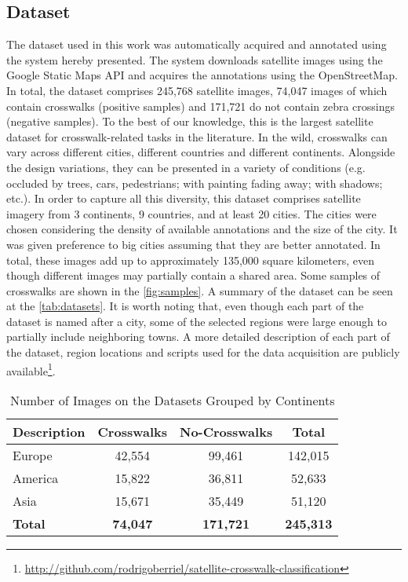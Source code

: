 \documentclass[journal]{IEEEtran}
\newcommand{\GoogleStaticMapsAPI}{Google Static Maps API\xspace}
\newcommand{\OpenStreetMap}{OpenStreetMap\xspace}
\begin{document}
\subsection{Dataset}
The dataset used in this work was automatically acquired and annotated using the system hereby presented. The system downloads satellite images using the \GoogleStaticMapsAPI and acquires the annotations using the \OpenStreetMap. In total, the dataset comprises 245,768 satellite images, 74,047 images of which contain crosswalks (positive samples) and 171,721 do not contain zebra crossings (negative samples). To the best of our knowledge, this is the largest satellite dataset for crosswalk-related tasks in the literature. In the wild, crosswalks can vary across different cities, different countries and different continents. Alongside the design variations, they can be presented in a variety of conditions (e.g. occluded by trees, cars, pedestrians; with painting fading away; with shadows; etc.). In order to capture all this diversity, this dataset comprises satellite imagery from 3 continents, 9 countries, and at least 20 cities. The cities were chosen considering the density of available annotations and the size of the city. It was given preference to big cities assuming that they are better annotated. In total, these images add up to approximately 135,000 square kilometers, even though different images may partially contain a shared area. Some samples of crosswalks are shown in the \autoref{fig:samples}. A summary of the dataset can be seen at the \autoref{tab:datasets}. It is worth noting that, even though each part of the dataset is named after a city, some of the selected regions were large enough to partially include neighboring towns. A more detailed description of each part of the dataset, region locations and scripts used for the data acquisition are publicly available\footnote{\url{http://github.com/rodrigoberriel/satellite-crosswalk-classification}}.

\begin{table}[!h]
	\centering
	\caption{Number of Images on the Datasets Grouped by Continents}
	\label{tab:datasets}
	\begin{tabular}{lccc}
		\toprule
		\textbf{Description}           & \textbf{Crosswalks} & \textbf{No-Crosswalks} & \textbf{Total} 	\\ \midrule
		Europe                		   & 42,554     		 & 99,461        		  & 142,015 		\\
		America               		   & 15,822     		 & 36,811        		  & 52,633 			\\
		Asia                  		   & 15,671    		 	 & 35,449        		  & 51,120  		\\ \midrule
		\textbf{Total}                 & \textbf{74,047}     & \textbf{171,721}       & \textbf{245,313}\\ \bottomrule
	\end{tabular}
\end{table}
\end{document}

